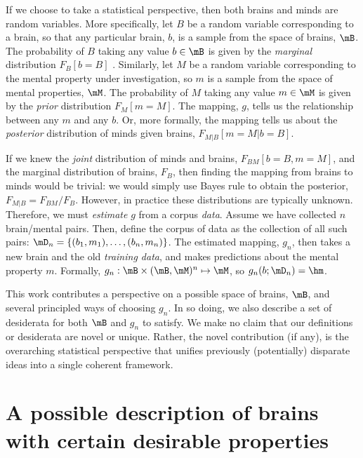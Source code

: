 If we choose to take a statistical perspective, then both brains and minds are random variables. More specifically, let $B$ be a random variable corresponding to a brain, so that any particular brain, $b$, is a sample from the space of brains, $\mB$. The probability of $B$ taking any value $b \in \mB$ is given by the \emph{marginal} distribution $F_B[b = B]$%
. Similarly, let $M$ be a random variable corresponding to the mental property under investigation, so $m$ is a sample from the space of mental properties, $\mM$. The probability of $M$ taking any value $m \in \mM$ is given by the \emph{prior} distribution $F_M[m = M]$. The mapping, $g$, tells us the relationship between any $m$ and any $b$. Or, more formally, the mapping tells us about the \emph{posterior} distribution of minds given brains, $F_{M|B}[m=M | b=B]$. 

If we knew the \emph{joint} distribution of minds and brains, $F_{BM}[b=B,m=M]$, and the marginal distribution of brains, $F_B$, then finding the mapping from brains to minds would be trivial: we would simply use Bayes rule to obtain the posterior, $F_{M|B} = F_{BM}/F_B$. However, in practice these distributions are typically unknown. Therefore, we must \emph{estimate} $g$ from a corpus \emph{data}. Assume we have collected $n$ brain/mental pairs. Then, define the corpus of data as the collection of all such pairs: $\mD_n=\{(b_1,m_1), \ldots, (b_n,m_n)\}$. The estimated mapping, $g_n$, then takes a new brain and the old \emph{training data}, and makes predictions about the mental property $m$. Formally, $g_n: \mB \times (\mB, \mM)^n \mapsto \mM$, so $g_n(b; \mD_n)=\hm$.

This work contributes a perspective on a possible space of brains, $\mB$, and several principled ways of choosing $g_n$. In so doing, we also describe a set of desiderata for both $\mB$ and $g_n$ to satisfy. We make no claim that our definitions or desiderata are novel or unique. Rather, the novel contribution (if any), is the overarching statistical perspective that unifies previously (potentially) disparate ideas into a single coherent framework.

\section{A possible description of brains with certain desirable properties} 

\label{sec:B}

